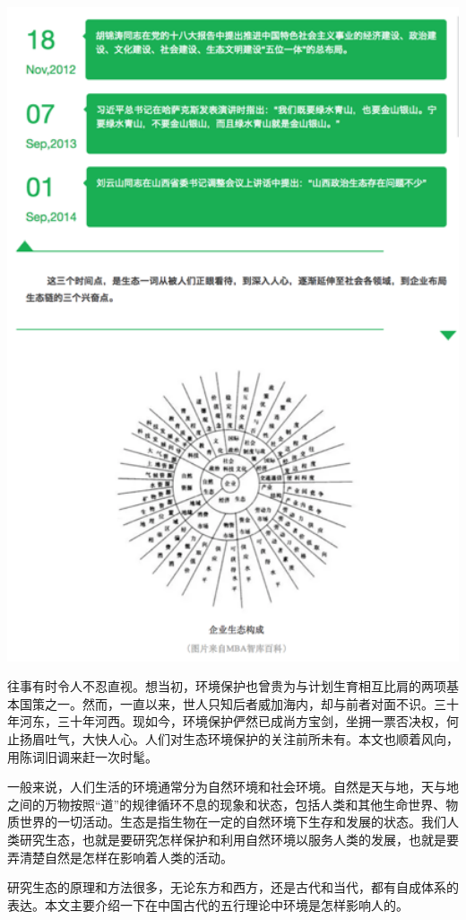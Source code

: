 \documentclass[
]{book}
\begin{document}
\includegraphics[width=5.76in]{images/swr2}

往事有时令人不忍直视。想当初，环境保护也曾贵为与计划生育相互比肩的两项基本国策之一。然而，一直以来，世人只知后者威加海内，却与前者对面不识。三十年河东，三十年河西。现如今，环境保护俨然已成尚方宝剑，坐拥一票否决权，何止扬眉吐气，大快人心。人们对生态环境保护的关注前所未有。本文也顺着风向，用陈词旧调来赶一次时髦。

一般来说，人们生活的环境通常分为自然环境和社会环境。自然是天与地，天与地之间的万物按照``道''的规律循环不息的现象和状态，包括人类和其他生命世界、物质世界的一切活动。生态是指生物在一定的自然环境下生存和发展的状态。我们人类研究生态，也就是要研究怎样保护和利用自然环境以服务人类的发展，也就是要弄清楚自然是怎样在影响着人类的活动。

研究生态的原理和方法很多，无论东方和西方，还是古代和当代，都有自成体系的表达。本文主要介绍一下在中国古代的五行理论中环境是怎样影响人的。
\end{document}
